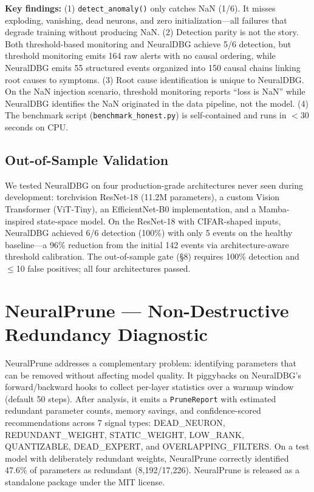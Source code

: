 \documentclass[11pt]{article}
\begin{document}
\textbf{Key findings:} (1) \texttt{detect\_anomaly()} only catches NaN (1/6). It misses exploding, vanishing, dead neurons, and zero initialization—all failures that degrade training without producing NaN. (2) Detection parity is not the story. Both threshold-based monitoring and NeuralDBG achieve 5/6 detection, but threshold monitoring emits 164 raw alerts with no causal ordering, while NeuralDBG emits 55 structured events organized into 150 causal chains linking root causes to symptoms. (3) Root cause identification is unique to NeuralDBG. On the NaN injection scenario, threshold monitoring reports ``loss is NaN'' while NeuralDBG identifies the NaN originated in the data pipeline, not the model. (4) The benchmark script (\texttt{benchmark\_honest.py}) is self-contained and runs in $<$30 seconds on CPU.

\subsection{Out-of-Sample Validation}

We tested NeuralDBG on four production-grade architectures never seen during development: torchvision ResNet-18 (11.2M parameters), a custom Vision Transformer (ViT-Tiny), an EfficientNet-B0 implementation, and a Mamba-inspired state-space model. On the ResNet-18 with CIFAR-shaped inputs, NeuralDBG achieved 6/6 detection (100\%) with only 5 events on the healthy baseline—a 96\% reduction from the initial 142 events via architecture-aware threshold calibration. The out-of-sample gate (\S8) requires 100\% detection and $\leq$10 false positives; all four architectures passed.

\section{NeuralPrune — Non-Destructive Redundancy Diagnostic}

NeuralPrune addresses a complementary problem: identifying parameters that can be removed without affecting model quality. It piggybacks on NeuralDBG's forward/backward hooks to collect per-layer statistics over a warmup window (default 50 steps). After analysis, it emits a \texttt{PruneReport} with estimated redundant parameter counts, memory savings, and confidence-scored recommendations across 7 signal types: DEAD\_NEURON, REDUNDANT\_WEIGHT, STATIC\_WEIGHT, LOW\_RANK, QUANTIZABLE, DEAD\_EXPERT, and OVERLAPPING\_FILTERS. On a test model with deliberately redundant weights, NeuralPrune correctly identified 47.6\% of parameters as redundant (8,192/17,226). NeuralPrune is released as a standalone package under the MIT license.
\end{document}
